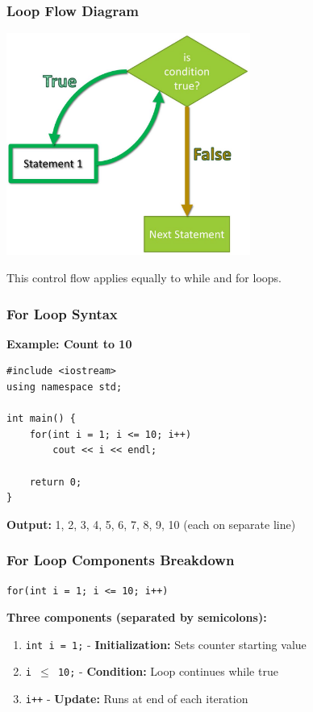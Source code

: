 \documentclass{beamer}
\begin{document}
\begin{frame}
\frametitle{Loop Flow Diagram}
\includegraphics[width=0.6\textwidth]{../images/While-Loop-Flowchart.jpg}

This control flow applies equally to while and for loops.
\end{frame}

\begin{frame}[fragile]
\frametitle{For Loop Syntax}
\textbf{Example: Count to 10}
\begin{verbatim}
#include <iostream>
using namespace std;

int main() {
    for(int i = 1; i <= 10; i++)
        cout << i << endl;
    
    return 0;
}
\end{verbatim}
\pause

\textbf{Output:} 1, 2, 3, 4, 5, 6, 7, 8, 9, 10 (each on separate line)
\end{frame}

\begin{frame}[fragile]
\frametitle{For Loop Components Breakdown}
\begin{verbatim}
for(int i = 1; i <= 10; i++)
\end{verbatim}
\pause

\textbf{Three components (separated by semicolons):}
\begin{enumerate}
\item \texttt{int i = 1;} - \textbf{Initialization:} Sets counter starting value\pause
\item \texttt{i $\leq$ 10;} - \textbf{Condition:} Loop continues while true\pause
\item \texttt{i++} - \textbf{Update:} Runs at end of each iteration
\end{enumerate}
\end{frame}
\end{document}
